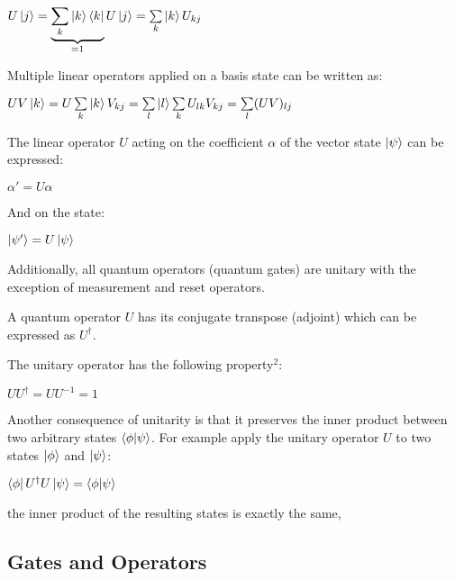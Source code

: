 \documentclass{article}
\begin{document}
\qquad $U\ket{j} = \underbrace{\sum\limits_k\ket{k}\bra{k}}_{ = 1} U\ket{j} = \sum\limits_k \ket{k} U_{kj}$
\vspace{5mm}

\noindent
Multiple linear operators applied on a basis state can be written as:
\vspace{5mm}

\qquad $UV\ket{k} = U\sum\limits_k \ket{k}V_{kj} = \sum\limits_l\ket{l} \sum\limits_k U_{lk} V_{kj} = \sum\limits_l(UV)_{lj}$
\vspace{5mm}

\noindent
The linear operator $U$ acting on the coefficient $\alpha$ of the vector state $\ket{\psi}$ can be expressed:
\vspace{5mm}

\qquad $\alpha' = U\alpha$
\vspace{5mm}

\noindent
And on the state:
\vspace{5mm}

\qquad $\ket{\psi'} = U\ket{\psi}$
\pagebreak

\noindent
Additionally, all quantum operators (quantum gates) are unitary with the exception of measurement and reset operators. 
\vspace{5mm}

\noindent
A quantum operator $U$ has its conjugate transpose (adjoint) which can be expressed as $U^{\dagger}$.
\vspace{5mm}

\noindent
The unitary operator has the following property\hyperlink{2}{$^2$}:
\vspace{5mm}

\qquad $UU^{\dagger} = UU^{-1} = 1$
\vspace{5mm}

\noindent
Another consequence of unitarity is that it preserves the inner product between two arbitrary states $\braket{\phi}{\psi}$. For example apply the unitary operator $U$ to two states $\ket{\phi}$ and $\ket{\psi}$:
\vspace{5mm}

\qquad $ \bra{\phi} U^{\dagger} U\ket{\psi} = \braket{\phi}{\psi}$
\vspace{5mm}

\noindent
the inner product of the resulting states is exactly the same,
\vspace{10mm}


\subsection{Gates and Operators}
\vspace{5mm}
\end{document}
